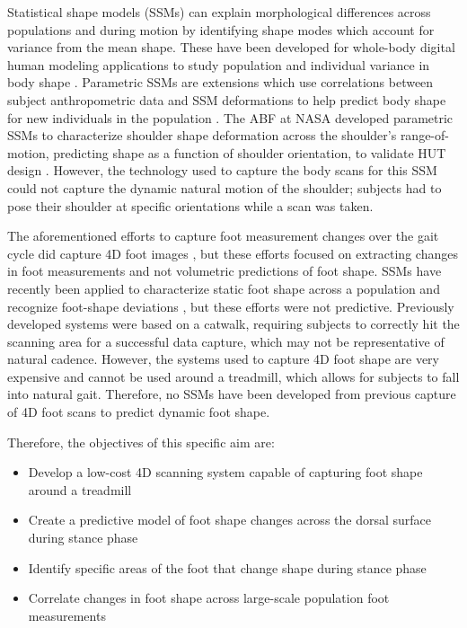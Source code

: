 \documentclass[defaultstyle,11pt]{thesis}
\providecommand{\tightlist}{%
  \setlength{\itemsep}{0pt}\setlength{\parskip}{0pt}}
\begin{document}
Statistical shape models (SSMs) can explain morphological differences across populations and during motion by identifying shape modes which account for variance from the mean shape.
These have been developed for whole-body digital human modeling applications to study population and individual variance in body shape \citep{Allen2003, Anguelov2005, Reed2014, Park2015a, Park2017}.
Parametric SSMs are extensions which use correlations between subject anthropometric data and SSM deformations to help predict body shape for new individuals in the population \citep{Park2015a, Park2017}.
The ABF at NASA developed parametric SSMs to characterize shoulder shape deformation across the shoulder's range-of-motion, predicting shape as a function of shoulder orientation, to validate HUT design \citep{Kim2016, Kim2019}.
However, the technology used to capture the body scans for this SSM could not capture the dynamic natural motion of the shoulder; subjects had to pose their shoulder at specific orientations while a scan was taken.

The aforementioned efforts to capture foot measurement changes over the gait cycle did capture 4D foot images \citep{Barisch-Fritz2014, Grau2018}, but these efforts focused on extracting changes in foot measurements and not volumetric predictions of foot shape.
SSMs have recently been applied to characterize static foot shape across a population \citep{Conrad2019} and recognize foot-shape deviations \citep{Stankovic2020, Schuster2021}, but these efforts were not predictive.
Previously developed systems were based on a catwalk, requiring subjects to correctly hit the scanning area for a successful data capture, which may not be representative of natural cadence.
However, the systems used to capture 4D foot shape are very expensive and cannot be used around a treadmill, which allows for subjects to fall into natural gait.
Therefore, no SSMs have been developed from previous capture of 4D foot scans to predict dynamic foot shape.

Therefore, the objectives of this specific aim are:

\begin{itemize}
\tightlist
\item
  Develop a low-cost 4D scanning system capable of capturing foot shape around a treadmill
\item
  Create a predictive model of foot shape changes across the dorsal surface during stance phase
\item
  Identify specific areas of the foot that change shape during stance phase
\item
  Correlate changes in foot shape across large-scale population foot measurements
\end{itemize}
\end{document}
